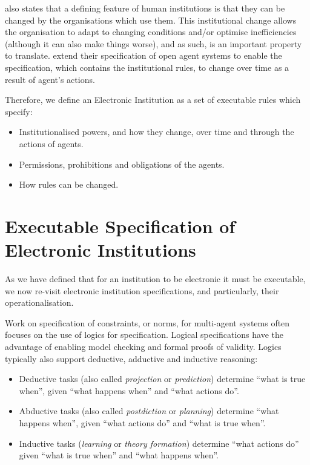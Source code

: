\citet{North1990} also states that a defining feature of human institutions is
that they can be changed by the organisations which use them. This
institutional change allows the organisation to adapt to changing conditions
and/or optimise inefficiencies (although it can also make things worse), and as such,
is an important property to translate. \citet{Artikis2012a} extend their
specification of open agent systems to enable the specification, which
contains the institutional rules, to change over time as a result of agent's
actions.

Therefore, we define an Electronic Institution as a set of executable
rules which specify:

\begin{itemize}
\item Institutionalised powers, and how they change, over time
and through the actions of agents. 
\item Permissions, prohibitions and obligations of
the agents.
\item How rules can be changed.
\end{itemize}

\section{Executable Specification of Electronic Institutions}

As we have defined that for an institution to be electronic it must be
executable, we now re-visit electronic institution specifications, and
particularly, their operationalisation. 

Work on specification of constraints, or norms, for multi-agent
systems often focuses on the use of logics for specification. Logical
specifications have the advantage of enabling model checking and formal proofs
of validity. Logics typically also support deductive, adductive and inductive
reasoning:

\begin{itemize}
\item Deductive tasks (also called \emph{projection} or
\emph{prediction}) determine ``what is true when'', given ``what happens
when'' and ``what actions do''. 
\item Abductive tasks (also called
\emph{postdiction} or \emph{planning}) determine ``what happens when'', given
``what actions do'' and ``what is true when''. 
\item Inductive tasks
(\emph{learning} or \emph{theory formation}) determine ``what actions do''
given ``what is true when'' and ``what happens when''. 
\end{itemize}

